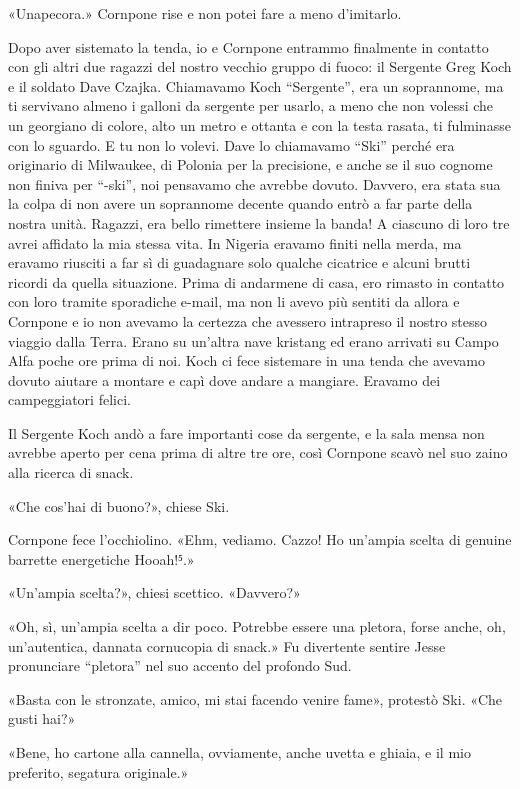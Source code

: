 «Unapecora.» Cornpone rise e non potei fare a meno d'imitarlo.

\hfill\break

Dopo aver sistemato la tenda, io e Cornpone entrammo finalmente in
contatto con gli altri due ragazzi del nostro vecchio gruppo di fuoco:
il Sergente Greg Koch e il soldato Dave Czajka. Chiamavamo Koch
``Sergente'', era un soprannome, ma ti servivano almeno i galloni da
sergente per usarlo, a meno che non volessi che un georgiano di colore,
alto un metro e ottanta e con la testa rasata, ti fulminasse con lo
sguardo. E tu non lo volevi. Dave lo chiamavamo ``Ski'' perché era
originario di Milwaukee, di Polonia per la precisione, e anche se il suo
cognome non finiva per ``-ski'', noi pensavamo che avrebbe dovuto.
Davvero, era stata sua la colpa di non avere un soprannome decente
quando entrò a far parte della nostra unità. Ragazzi, era bello
rimettere insieme la banda! A ciascuno di loro tre avrei affidato la mia
stessa vita. In Nigeria eravamo finiti nella merda, ma eravamo riusciti
a far sì di guadagnare solo qualche cicatrice e alcuni brutti ricordi da
quella situazione. Prima di andarmene di casa, ero rimasto in contatto
con loro tramite sporadiche e-mail, ma non li avevo più sentiti da
allora e Cornpone e io non avevamo la certezza che avessero intrapreso
il nostro stesso viaggio dalla Terra. Erano su un'altra nave kristang ed
erano arrivati su Campo Alfa poche ore prima di noi. Koch ci fece
sistemare in una tenda che avevamo dovuto aiutare a montare e capì dove
andare a mangiare. Eravamo dei campeggiatori felici.

Il Sergente Koch andò a fare importanti cose da sergente, e la sala
mensa non avrebbe aperto per cena prima di altre tre ore, così Cornpone
scavò nel suo zaino alla ricerca di snack.

«Che cos'hai di buono?», chiese Ski.

Cornpone fece l'occhiolino. «Ehm, vediamo. Cazzo! Ho un'ampia scelta di
genuine barrette energetiche Hooah!⁵.»

«Un'ampia scelta?», chiesi scettico. «Davvero?»

«Oh, sì, un'ampia scelta a dir poco. Potrebbe essere una pletora, forse
anche, oh, un'autentica, dannata cornucopia di snack.» Fu divertente
sentire Jesse pronunciare ``pletora'' nel suo accento del profondo Sud.

«Basta con le stronzate, amico, mi stai facendo venire fame», protestò
Ski. «Che gusti hai?»

«Bene, ho cartone alla cannella, ovviamente, anche uvetta e ghiaia, e il
mio preferito, segatura originale.»

